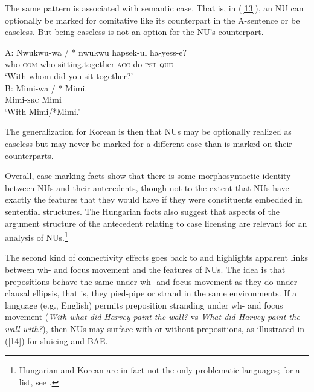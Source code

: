 \documentclass[output=paper
                ,modfonts
                ,nonflat
	        ,collection
	        ,collectionchapter
	        ,collectiontoclongg
 	        ,biblatex
                ,babelshorthands
                ,newtxmath
                ,draftmode
                ,colorlinks, citecolor=brown
]{./langsci/langscibook}
\begin{document}
{The same pattern is associated with semantic case. That is, in (\ref{13}), an NU can optionally be
marked for comitative like its counterpart in the A-sentence or be caseless. But being caseless is
not an option for the NU's counterpart.

\ea
A: 
\gll Nwukwu-wa         /  *  nwukwu  hapsek-ul                     ha-yess-e?\\
     who-\textsc{com}  {} {} who     sitting.together-\textsc{acc} do-\textsc{pst}-\textsc{que}\\
\glt  `With whom did you sit together?'\\

B: 
\gll Mimi-wa / * Mimi.\\
     Mimi-\textsc{src} {} {} Mimi\\
\glt `With Mimi/*Mimi.' \label{13}\z

The generalization for Korean is then that NUs may be optionally realized as caseless but may never be marked for a different case than is marked on their counterparts.

Overall, case-marking facts show that there is some morphosyntactic identity between NUs and their antecedents, though not to the extent that NUs have exactly the features that they would have if they were constituents embedded in sentential structures. The Hungarian facts also suggest that aspects of the argument structure of the antecedent relating to case licensing are relevant for an analysis of NUs.\footnote{Hungarian and Korean are in fact not the only problematic languages; for a list, see \citet{Vicente2015}.}

The second kind of connectivity effects goes back to \citet{Merchant2001, Merchant2004} and highlights apparent links between wh- and focus movement and the features of NUs. The idea is that prepositions behave the same under wh- and focus movement as they do under clausal ellipsis, that is, they pied-pipe or strand in the same environments. If a language (e.g., English) permits preposition stranding under wh- and focus movement ({\it With what did Harvey paint the wall?} vs {\it What did Harvey paint the wall with?}), then NUs may surface with or without prepositions, as illustrated in (\ref{14}) for sluicing and BAE.

}
\end{document}
